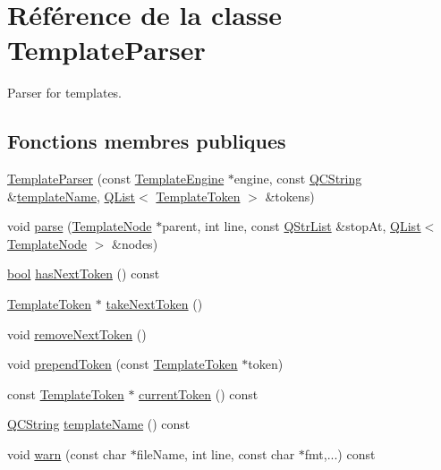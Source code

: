 \hypertarget{class_template_parser}{}\section{Référence de la classe Template\+Parser}
\label{class_template_parser}


Parser for templates.  


\subsection*{Fonctions membres publiques}
\begin{DoxyCompactItemize}
\item 
\hyperlink{class_template_parser_a074067c80442cfb4e103bc5183679073}{Template\+Parser} (const \hyperlink{class_template_engine}{Template\+Engine} $\ast$engine, const \hyperlink{class_q_c_string}{Q\+C\+String} \&\hyperlink{class_template_parser_af8f8fa984a41d765f235db509f6d9a17}{template\+Name}, \hyperlink{class_q_list}{Q\+List}$<$ \hyperlink{class_template_token}{Template\+Token} $>$ \&tokens)
\item 
void \hyperlink{class_template_parser_a09037d32371845f07d8996b0d7b1d24d}{parse} (\hyperlink{class_template_node}{Template\+Node} $\ast$parent, int line, const \hyperlink{class_q_str_list}{Q\+Str\+List} \&stop\+At, \hyperlink{class_q_list}{Q\+List}$<$ \hyperlink{class_template_node}{Template\+Node} $>$ \&nodes)
\item 
\hyperlink{qglobal_8h_a1062901a7428fdd9c7f180f5e01ea056}{bool} \hyperlink{class_template_parser_a14daa11a9a3b70c5d0fb7b2c13ebce71}{has\+Next\+Token} () const 
\item 
\hyperlink{class_template_token}{Template\+Token} $\ast$ \hyperlink{class_template_parser_acbe18fdf2b8306342e283e906826a3ae}{take\+Next\+Token} ()
\item 
void \hyperlink{class_template_parser_ac3e5fb3ee5dfcccbcf85440bd3b59d53}{remove\+Next\+Token} ()
\item 
void \hyperlink{class_template_parser_a2f48f4d2f14f5cafc4f662613c2046c5}{prepend\+Token} (const \hyperlink{class_template_token}{Template\+Token} $\ast$token)
\item 
const \hyperlink{class_template_token}{Template\+Token} $\ast$ \hyperlink{class_template_parser_a1cf0b832eb5cf48b86648e62e95c4e0c}{current\+Token} () const 
\item 
\hyperlink{class_q_c_string}{Q\+C\+String} \hyperlink{class_template_parser_af8f8fa984a41d765f235db509f6d9a17}{template\+Name} () const 
\item 
void \hyperlink{class_template_parser_add2bc69a335d60c305660c42dbb52cf2}{warn} (const char $\ast$file\+Name, int line, const char $\ast$fmt,...) const 
\end{DoxyCompactItemize}


